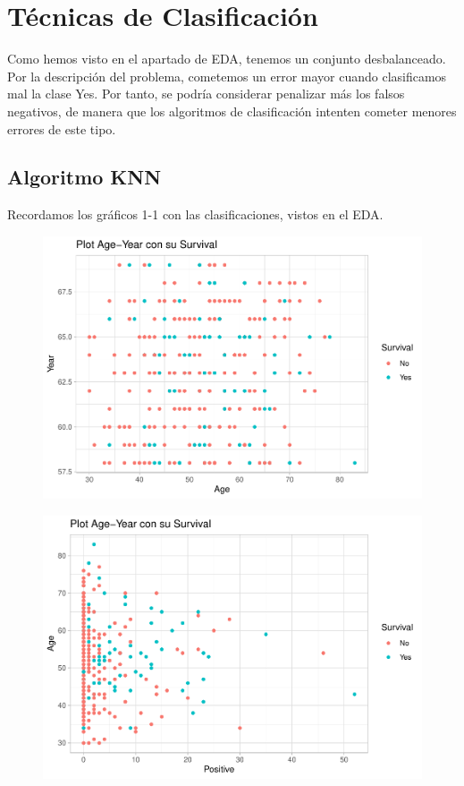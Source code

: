 \section{Técnicas de Clasificación}

Como hemos visto en el apartado de EDA, tenemos un conjunto desbalanceado. Por la descripción del problema, cometemos un error mayor cuando clasificamos mal la clase Yes. Por tanto, se podría considerar penalizar más los falsos negativos, de manera que los algoritmos de clasificación intenten cometer menores errores de este tipo. 

\subsection{Algoritmo KNN}

Recordamos los gráficos 1-1 con las clasificaciones, vistos en el EDA.

\begin{figure}[H]\center\includegraphics[width=.9\linewidth]{img/Clasificacion_files/figure-latex/unnamed-chunk-7-1}\caption{}\end{figure}

\begin{figure}[H]\center\includegraphics[width=.9\linewidth]{img/Clasificacion_files/figure-latex/unnamed-chunk-7-2}\caption{}\end{figure}

